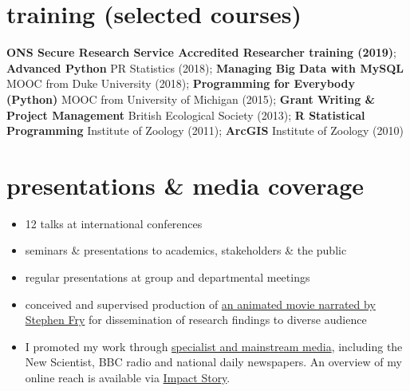 \documentclass[]{friggeri-cv-a4}
\begin{document}
\newpage
{}


\section{training (selected courses)}

\textbf{ONS Secure Research Service Accredited Researcher training (2019)};
\textbf{Advanced Python} PR Statistics (2018);
\textbf{Managing Big Data with MySQL} MOOC from Duke University (2018);
\textbf{Programming for Everybody (Python)} MOOC from University of Michigan (2015);
\textbf{Grant Writing \& Project Management} British Ecological Society (2013);
\textbf{R Statistical Programming} Institute of Zoology (2011);
\textbf{ArcGIS} Institute of Zoology (2010)


\section{presentations \& media coverage}

\begin{itemize}
\item 12 talks at international conferences
\item seminars \& presentations to academics, stakeholders \& the public
\item regular presentations at group and departmental meetings
\item conceived and supervised production of \href{https://2infectious.wordpress.com/2019/06/25/where-did-the-frogs-go-and-why/}{an animated movie narrated by Stephen Fry} for dissemination of research findings to diverse audience
\item I promoted my work through \href{https://2infectious.wordpress.com/in-the-media/}{specialist and mainstream media}, including the New Scientist, BBC radio and national daily newspapers. An overview of my online reach is available via \href{https://profiles.impactstory.org/u/0000-0001-6983-6250}{Impact Story}.
\end{itemize}
\end{document}
